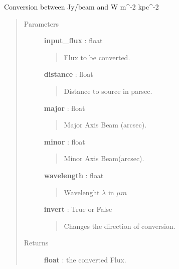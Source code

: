 \documentclass[a4paper,10pt,english]{sphinxmanual}
\begin{document}
\begin{fulllineitems}
\label{functions:astrolyze.functions.units.JyBToWM2Kpc2}
Conversion between Jy/beam and W m\textasciicircum{}-2 kpc\textasciicircum{}-2
\begin{quote}\begin{description}
\item[{Parameters }] \leavevmode
\textbf{input\_flux} :  float
\begin{quote}

Flux to be converted.
\end{quote}

\textbf{distance} : float
\begin{quote}

Distance to source in parsec.
\end{quote}

\textbf{major} : float
\begin{quote}

Major Axis Beam (arcsec).
\end{quote}

\textbf{minor} : float
\begin{quote}

Minor Axis Beam(arcsec).
\end{quote}

\textbf{wavelength} : float
\begin{quote}

Wavelenght $\lambda$ in $\mu m$
\end{quote}

\textbf{invert} : True or False
\begin{quote}

Changes the direction of conversion.
\end{quote}

\item[{Returns }] \leavevmode
\textbf{float} : the converted Flux.

\end{description}\end{quote}

\end{fulllineitems}

\end{document}
